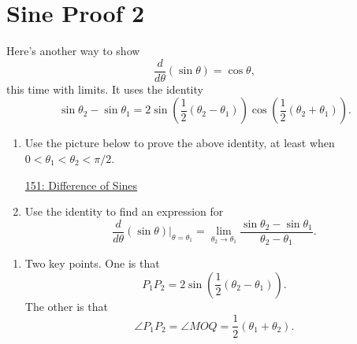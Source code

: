 \documentclass{ximera}
\begin{document}
\section{Sine Proof 2}

\begin{example} \label{JJJD3}

Here's another way to show
\[
   \frac{d}{d\theta}\left(  \sin\theta \right) = \cos\theta ,
\]
this time with limits. It uses the identity
\[
 \sin\theta_2 - \sin \theta_1 = 2\sin\left( \frac{1}{2}\left( \theta_2 - \theta_1 \right)\right) \cos \left( \frac{1}{2}\left( \theta_2 +\theta_1 \right)\right) .
\]

\begin{enumerate}

\item Use the picture below to prove the above identity, at least when $0 < \theta_1 < \theta_2 < \pi/2$.

\begin{onlineOnly}
    \begin{center}
\end{center}
\end{onlineOnly}

\href{https://www.desmos.com/calculator/yppjwpuhkz}{151: Difference of Sines}

\item Use the identity to find an expression for
\[
       \frac{d}{d\theta}\left(  \sin\theta \right)\Big|_{\theta = \theta_1} = \lim_{\theta_2\to\theta_1} \frac{\sin\theta_2 - \sin\theta_1}{\theta_2 - \theta_1}.
\]
\begin{freeResponse}
\end{freeResponse}
\end{enumerate}

\begin{explanation}
\begin{enumerate}
\item Two key points. One is that
\[
    P_1 P_2 = 2\sin \left( \frac{1}{2}\left( \theta_2 - \theta_1 \right)   \right).
\]
The other is that
\[
  \angle P_1 P_2   = \angle  MOQ = \frac{1}{2}\left( \theta_1 + \theta_2 \right).
\]


\end{enumerate}
\end{explanation}
\end{example}
\end{document}
